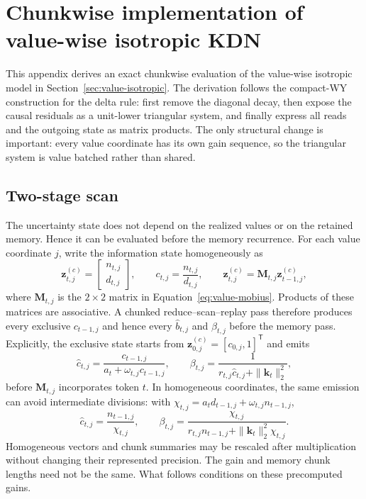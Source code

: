 \documentclass[11pt]{article}
\newcommand{\ve}[1]{\boldsymbol{#1}}
\newcommand{\tr}{\mathsf{T}}
\begin{document}
\appendix

\section{Chunkwise implementation of value-wise isotropic KDN}
\label{app:value-wise-chunkwise}

This appendix derives an exact chunkwise evaluation of the value-wise isotropic model in
Section~\ref{sec:value-isotropic}.  The derivation follows the compact-WY construction for the
delta rule: first remove the diagonal decay, then expose the causal residuals as a unit-lower
triangular system, and finally express all reads and the outgoing state as matrix products.  The
only structural change is important: every value coordinate has its own gain sequence, so the
triangular system is value batched rather than shared.

\subsection{Two-stage scan}
\label{app:value-wise-two-stage}

The uncertainty state does not depend on the realized values or on the retained memory.  Hence it
can be evaluated before the memory recurrence.  For each value coordinate $j$, write the
information state homogeneously as
\begin{equation}
  \ve{z}^{(c)}_{t,j}
  =\begin{bmatrix}n_{t,j}\\d_{t,j}\end{bmatrix},
  \qquad
  c_{t,j}=\frac{n_{t,j}}{d_{t,j}},
  \qquad
  \ve{z}^{(c)}_{t,j}=\ve{M}_{t,j}\ve{z}^{(c)}_{t-1,j},
  \label{eq:value-chunk-homogeneous-information}
\end{equation}
where $\ve{M}_{t,j}$ is the $2\times2$ matrix in
Equation~\eqref{eq:value-mobius}.  Products of these matrices are associative.  A chunked
reduce--scan--replay pass therefore produces every exclusive $c_{t-1,j}$ and hence every
$\widehat b_{t,j}$ and $\beta_{t,j}$ before the memory pass.  Explicitly, the exclusive state
starts from $\ve{z}^{(c)}_{0,j}=[c_{0,j},1]^{\tr}$ and emits
\begin{equation}
  \widehat c_{t,j}
  =\frac{c_{t-1,j}}{a_t+\omega_{t,j}c_{t-1,j}},
  \qquad
  \beta_{t,j}
  =\frac{1}{r_{t,j}\widehat c_{t,j}+\|\ve{k}_t\|_2^2},
  \label{eq:value-chunk-exclusive-gain}
\end{equation}
before $\ve{M}_{t,j}$ incorporates token $t$.  In homogeneous coordinates, the same emission can
avoid intermediate divisions: with
$\chi_{t,j}=a_td_{t-1,j}+\omega_{t,j}n_{t-1,j}$,
\begin{equation}
  \widehat c_{t,j}=\frac{n_{t-1,j}}{\chi_{t,j}},
  \qquad
  \beta_{t,j}
  =\frac{\chi_{t,j}}
   {r_{t,j}n_{t-1,j}+\|\ve{k}_t\|_2^2\chi_{t,j}}.
  \label{eq:value-chunk-homogeneous-gain}
\end{equation}
Homogeneous vectors and chunk summaries may be rescaled after multiplication without changing
their represented precision.  The gain and memory chunk lengths need not be the same.  What
follows conditions on these precomputed gains.
\end{document}
